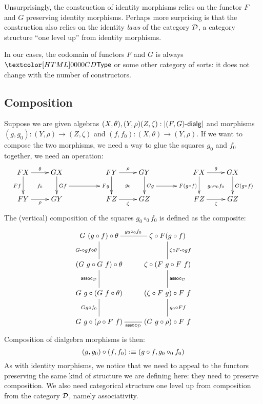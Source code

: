 Unsurprisingly, the construction of identity morphisms relies on the
functor $F$ and $G$ preserving identity morphisms. Perhaps more
surprising is that the construction also relies on the identity
\emph{laws} of the category $\mathcal{D}$, \ie a category structure ``one
level up'' from identity morphisms.

In our cases, the codomain of functors $F$ and $G$ is always $\Type$
or some other category of sorts: it does not change with the number of
constructors.

\subsection{Composition}

Suppose we are given algebras
$(X,\theta),(Y,\rho)(Z,\zeta) : | \dialgcat{F}{G} |$ and morphisms
$(g,g_0) : (Y,\rho) \to (Z,\zeta)$ and
$(f,f_0) : (X,\theta) \to (Y,\rho)$. If we want to compose the two
morphisms, we need a way to glue the squares $g_0$ and $f_0$ together,
\ie we need an operation:
$$
\xymatrix{
 FX \ar[r]^\theta \ar[d]_{F f}                 \ar@{}[dr]|{f_0} &GX \ar[d]^{G f}="Gf"
&
&FY \ar[r]^\rho   \ar[d]_{F g}="Fg"            \ar@{}[dr]|{g_0} &GY \ar[d]^{G g}="Gg"
&
&FX \ar[r]^\theta \ar[d]_{F (g \circ f)}="Fgf" \ar@{}[dr]|{g_0 \circ_0 f_0} &GX \ar[d]^{G (g \circ f)}
\\ 
 FY \ar[r]_{\rho}  &GY
&
&FZ \ar[r]_{\zeta} &GZ
&
&FZ \ar[r]_{\zeta} &GZ
\ar "Gf";"Fg"
\ar "Gg";"Fgf"
}
$$
The (vertical) composition of the squares $g_0 \circ_0 f_0$ is defined as the composite:
$$
\xymatrix{
G\ (g \circ f) \circ \theta
\ar@{-}[r]^{g_0 \circ_0 f_0}
\ar@{-}[d]_{\Gcomp g f \circ \theta}
&\zeta \circ F(g \circ f)
\ar@{-}[d]^{\zeta \circ \Fcomp g f}
\\
(G\ g \circ G\ f) \circ \theta
\ar@{-}[d]_{\assoc_{\Dd}}
&\zeta \circ (F\ g \circ F\ f)
\ar@{-}[d]^{\assoc_{\Dd}}
\\
G\ g \circ (G\ f \circ \theta)
\ar@{-}[d]_{G g \circ f_0}
&(\zeta \circ F\ g) \circ F\ f
\ar@{-}[d]^{g_0 \circ F f}
\\
G\ g \circ (\rho \circ F\ f)
\ar@{-}[r]_{\assoc_{\Dd}}
&(G\ g \circ \rho) \circ F\ f
}
$$
Composition of dialgebra morphisms is then:
$$
(g,g_0) \circ (f,f_0) :\equiv (g \circ f , g_0 \circ_0 f_0)
$$
As with identity morphisms, we notice that we need to appeal to the
functors preserving the same kind of structure we are defining here:
they need to preserve composition. We also need categorical structure
one level up from composition from the category $\mathcal{D}$, namely
associativity.

